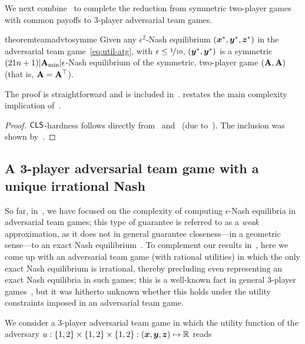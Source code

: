 We next combine~ to complete the reduction from symmetric two-player games with common payoffs to $3$-player adversarial team games.

\begin{restatable}{theorem}{teamadvtosymme}
    \label{thm:teamadvtosymme}
    Given any $\epsilon^2$-Nash equilibrium $({\bm{x}}^*, {\bm{y}}^*, {\bm{z}}^*)$ in the adversarial team game~\eqref{eq:util-atg}, with $\epsilon \leq \nicefrac{1}{10}$, $({\bm{y}}^* , {\bm{y}}^*)$ is a symmetric $(21 n + 1) |\mathbf{A}_{\min}| \epsilon$-Nash equilibrium of the symmetric, two-player game $(\mathbf{A}, \mathbf{A})$ (that is, $\mathbf{A} = \mathbf{A}^\top$).
\end{restatable}

The proof is straightforward and is included in~.  restates the main complexity implication of~.

\maincls*

\begin{proof}
    $\mathsf{CLS}$-hardness follows directly from~ and~ (due to~\citet{ghosh2024complexitysymmetricbimatrixgames}). The inclusion was shown by~\citet{Anagnostides23:Algorithms}.
\end{proof}

\subsection{A 3-player adversarial team game with a unique irrational Nash}

So far, in~, we have focused on the complexity of computing $\epsilon$-Nash equilibria in adversarial team games; this type of guarantee is referred to as a \emph{weak} approximation, as it does not in general guarantee closeness---in a geometric sense---to an exact Nash equilibrium~\citep{Etessami10:On}. To complement our results in~, here we come up with an adversarial team game (with rational utilities) in which the only exact Nash equilibrium is irrational, thereby precluding even representing an exact Nash equilibria in such games; this is a well-known fact in general $3$-player games~\citep{Etessami10:On}, but it was hitherto unknown whether this holds under the utility constraints imposed in an adversarial team game.

We consider a $3$-player adversarial team game in which the utility function of the adversary $u : \{1, 2\} \times \{1, 2\} \times \{1, 2\} : ({\bm{x}}, {\bm{y}}, {\bm{z}}) \mapsto \mathbb{R}$ reads


